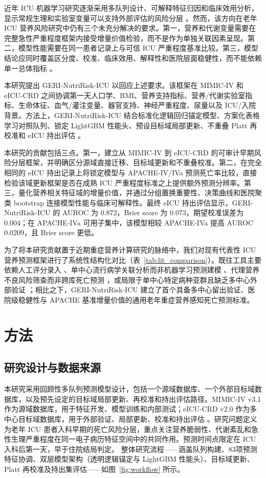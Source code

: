 \documentclass[11pt]{ctexart}
\begin{document}
近年 ICU 机器学习研究逐渐采用多队列设计、可解释特征归因和临床效用分析，显示常规生理和实验室变量可以支持外部评估的风险分层 \citep{Zhang2025IBD,Liu2026TabPFN,Huynh2026PAR}。然而，该方向在老年 ICU 营养风险研究中仍有三个未充分解决的要求。第一，营养和代谢变量需要在完整急性严重程度框架内接受增量价值检验，而不是作为单独关联因素呈现。第二，模型性能需要在同一患者记录上与可信 ICU 严重程度基准比较。第三，模型结论应同时覆盖区分度、校准、临床效用、解释性和医院层面稳健性，而不能依赖单一总体指标 \citep{Vickers2006DCA,Ghassemi2021XAI}。

本研究提出 GERI-NutriRisk-ICU 以回应上述要求。该框架在 MIMIC-IV 和 eICU-CRD 之间协调第一天人口学、BMI、营养支持指标、营养/代谢实验室指标、生命体征、血气/灌注变量、器官支持、神经严重程度、尿量以及 ICU/入院背景。方法上，GERI-NutriRisk-ICU 结合标准化逻辑回归锚定模型、方案化表格学习对照队列、锁定 LightGBM 性能头、预设目标域局部更新、不重叠 Platt 再校准和 eICU 持出评估 \citep{Chen2016XGBoost,Ke2017LightGBM}。

本研究的贡献包括三点。第一，建立从 MIMIC-IV 到 eICU-CRD 的可审计早期风险分层框架，并明确区分源域直接迁移、目标域更新和不重叠校准。第二，在完全相同的 eICU 持出记录上将锁定模型与 APACHE-IV/IVa 预测死亡率比较，直接检验该域更新框架是否在成熟 ICU 严重程度标准之上提供额外预测分辨率。第三，量化营养相关特征域的增量价值，并通过分组置换重要性、决策曲线和医院聚类 bootstrap 连接模型性能与临床可解释性。最终 eICU 持出评估显示，GERI-NutriRisk-ICU 的 AUROC 为 0.872，Brier score 为 0.073，期望校准误差为 0.004；在 APACHE-IVa 可用子集中，该模型相较 APACHE-IVa 提高 AUROC 0.0209，且 Brier score 更低。

为了将本研究贡献置于近期重症营养计算研究的脉络中，我们对现有代表性 ICU 营养预测框架进行了系统性结构化对比（表~\ref{tab:lit_comparison}）。既往工具主要依赖人工评分录入 \citep{Heyland2011NUTRIC}、单中心流行病学关联分析而非机器学习预测建模 \citep{Peng2023GNRI}、代理营养不良风险筛查而非跨库死亡预测 \citep{Zhang2026ENUTRIC}，或局限于单中心特定病种亚群且缺乏多中心外部验证 \citep{Cao2026NIM}；相比之下，GERI-NutriRisk-ICU 建立了首个具备多中心留出验证、医院级稳健性与 APACHE 基准增量价值的通用老年重症营养感知死亡预测标准。



\section{方法}
\subsection{研究设计与数据来源}
本研究采用回顾性多队列预测模型设计，包括一个源域数据库、一个外部目标域数据库，以及预先设定的目标域局部更新、再校准和持出评估路径。MIMIC-IV v3.1 作为源域数据库，用于特征开发、模型训练和内部测试；eICU-CRD v2.0 作为多中心目标域数据库，用于外部验证、局部更新、校准和持出评估 \citep{PhysioNetMIMICIV31,PhysioNetEICU20,Johnson2023MIMICIV,Pollard2018EICU}。研究问题定义为老年 ICU 患者入科早期的死亡风险分层，重点关注营养脆弱性、代谢紊乱和急性生理严重程度在同一电子病历特征空间中的共同作用。预测时间点限定在 ICU 入科后第一天，早于住院结局判定。 整体研究流程——涵盖队列构建、83项预测特征协调、双层模型架构（透明逻辑锚定与 LightGBM 性能头）、目标域更新、Platt 再校准及持出集评估——如图~\ref{fig:workflow} 所示。
\end{document}
